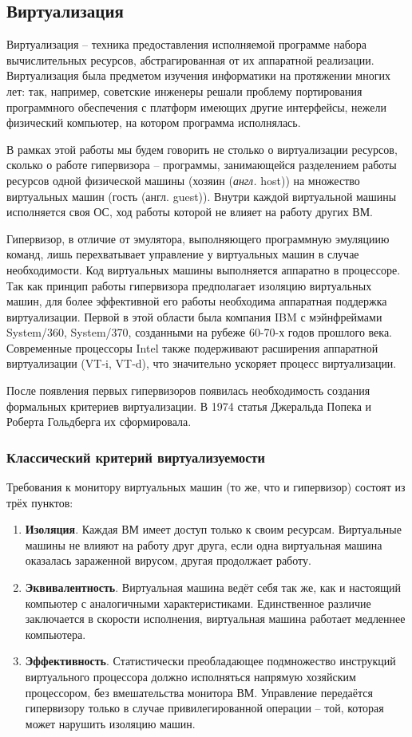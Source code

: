 \documentclass[a4paper,12pt]{extarticle}
\begin{document}
	\subsection{Виртуализация}
	Виртуализация – техника предоставления исполняемой программе набора вычислительных ресурсов, абстрагированная от их аппаратной реализации. Виртуализация была предметом изучения информатики на протяжении многих лет: так, например, советские инженеры решали проблему портирования программного обеспечения с платформ имеющих другие интерфейсы, нежели физический компьютер, на котором программа исполнялась.\par
	В рамках этой работы мы будем говорить не столько о виртуализации ресурсов, сколько о работе гипервизора – программы, занимающейся разделением работы ресурсов одной физической машины (хозяин (\textit{англ.} host)) на множество виртуальных машин (гость (англ. guest)). Внутри каждой виртуальной машины исполняется своя ОС, ход работы которой не влияет на работу других ВМ.\par
	Гипервизор, в отличие от эмулятора, выполняющего программную эмуляциию команд, лишь перехватывает управление у виртуальных машин в случае необходимости. Код виртуальных машины выполняется аппаратно в процессоре. Так как принцип работы гипервизора предполагает изоляцию виртуальных машин, для более эффективной его работы необходима аппаратная поддержка виртуализации. Первой в этой области была компания IBM с мэйнфреймами System/360, System/370, созданными на рубеже 60-70-х годов прошлого века. Современные процессоры Intel также подерживают расширения аппаратной виртуализации (VT-i, VT-d), что значительно ускоряет процесс виртуализации.\par
	После появления первых гипервизоров появилась необходимость создания формальных критериев виртуализации. В 1974 статья Джеральда Попека и Роберта Гольдберга их сформировала.\par
	\subsubsection{Классический критерий виртуализуемости}
	Требования к монитору виртуальных машин (то же, что и гипервизор) состоят из трёх пунктов:
	\begin{enumerate}
		\item \textbf{Изоляция}. Каждая ВМ имеет доступ только к своим ресурсам. Виртуальные машины не влияют на работу друг друга, если одна виртуальная машина оказалась зараженной вирусом, другая продолжает работу.
		\item \textbf{Эквивалентность}. Виртуальная машина ведёт себя так же, как и настоящий компьютер с аналогичными характеристиками. Единственное различие заключается в скорости исполнения, виртуальная машина работает медленнее компьютера.
		\item \textbf{Эффективность}. Статистически преобладающее подмножество инструкций виртуального процессора должно исполняться напрямую хозяйским процессором, без вмешательства монитора ВМ. Управление передаётся гипервизору только в случае привилегированной операции – той, которая может нарушить изоляцию машин.
	\end{enumerate}
\end{document}
